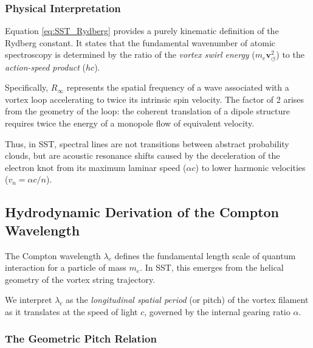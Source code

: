     \subsubsection*{Physical Interpretation}

        Equation \eqref{eq:SST_Rydberg} provides a purely kinematic definition
        of the Rydberg constant. It states that the fundamental wavenumber of
        atomic spectroscopy is determined by the ratio of the \emph{vortex
swirl energy} ($m_e \mathbf{v}_{\!\boldsymbol{\circlearrowleft}}^2$) to the \emph{action-speed product} ($hc$).

        Specifically, $R_\infty$ represents the spatial frequency of a wave
        associated with a vortex loop accelerating to twice its intrinsic spin
        velocity. The factor of 2 arises from the geometry of the loop: the
        coherent translation of a dipole structure requires twice the energy
        of a monopole flow of equivalent velocity.

        Thus, in SST, spectral lines are not transitions between abstract
        probability clouds, but are acoustic resonance shifts caused by the
        deceleration of the electron knot from its maximum laminar speed
        ($\alpha c$) to lower harmonic velocities ($v_n = \alpha c / n$).
\subsection{Hydrodynamic Derivation of the Compton Wavelength}
    \label{sec:SST_compton}

    The Compton wavelength $\lambda_c$ defines the fundamental length scale of
    quantum interaction for a particle of mass $m_e$. In SST, this emerges
    from the helical geometry of the vortex string trajectory.

    We interpret $\lambda_c$ as the \emph{longitudinal spatial period} (or pitch)
    of the vortex filament as it translates at the speed of light $c$,
    governed by the internal gearing ratio $\alpha$.

    \subsubsection*{The Geometric Pitch Relation}

